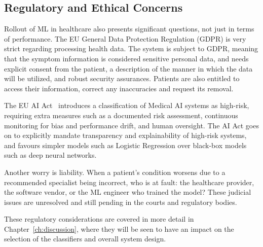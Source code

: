 \subsection{Regulatory and Ethical Concerns}

Rollout of ML in healthcare also presents significant questions, not just in terms of performance. The EU General Data Protection Regulation (GDPR) is very strict regarding processing health data. The system is subject to GDPR, meaning that the symptom information is considered sensitive personal data, and needs explicit consent from the patient, a description of the manner in which the data will be utilized, and robust security assurances. Patients are also entitled to access their information, correct any inaccuracies and request its removal.

The EU AI Act~\citep{EUAI2024} introduces a classification of Medical AI systems as high-risk, requiring extra measures such as a documented risk assessment, continuous monitoring for bias and performance drift, and human oversight. The AI Act goes on to explicitly mandate transparency and explainability of high-risk systems, and favours simpler models such as Logistic Regression over black-box models such as deep neural networks.

Another worry is liability. When a patient's condition worsens due to a recommended specialist being incorrect, who is at fault: the healthcare provider, the software vendor, or the ML engineer who trained the model? These judicial issues are unresolved and still pending in the courts and regulatory bodies.

These regulatory considerations are covered in more detail in Chapter~\ref{ch:discussion}, where they will be seen to have an impact on the selection of the classifiers and overall system design.